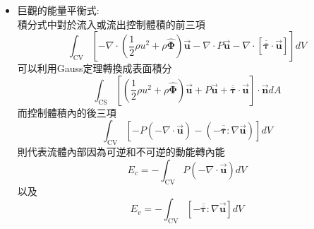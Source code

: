 \documentclass[../main.tex]{subfiles}
\begin{document}
\begin{itemize}
\begin{itemize}
      如果$\overline{\overline{\bm \tau}}$是牛頓流體，則可以代入其定義
      \begin{equation}
        -\overline{\overline{\bm \tau}}: \nabla \vec{\bm u} =\frac{2}{3}\mu \sum_{i=1}^{3}\sum_{j=1}^{3}\left[
          \left(
          \frac{\partial u_i}{\partial x_i} + \frac{\partial u_j}{\partial x_j}
        \right) - \frac{2}{3}\delta_{ij} \nabla \cdot \vec{\bm u}
        \right]^2 + \kappa \left(
          \nabla \cdot \vec{\bm u}
        \right)^2 = \mu \bm \Phi_u + \kappa \bm \Phi_b \label{eq:viscous_dissipation}
      \end{equation}
      $\bm \Phi_u$為剪切耗散函數(Shear Dissipation Function)\\
      $\bm \Phi_b$為體積耗散函數(Bulk Dissipation Function)\\
      兩者皆恆正，代表不可逆的能量耗散，並分別代表流體的抗剪和抗壓能力
    \item 巨觀的能量平衡式:\\
      積分式中對於流入或流出控制體積的前三項
      \begin{equation}
        \int_{\text{CV}} \left[
          -\nabla \cdot \left(
            \frac{1}{2}\rho u^2 + \rho \hat{\bm \Phi}
          \right) \vec{\bm u}
          - \nabla \cdot P \vec{\bm u}
          - \nabla \cdot [\overline{\overline{\bm \tau}} \cdot \vec{\bm u}]
        \right] dV
      \end{equation}
      可以利用Gauss定理轉換成表面積分
      \begin{equation}
        \int_{\text{CS}} \left[
          \left(
            \frac{1}{2}\rho u^2 + \rho \hat{\bm \Phi}
          \right) \vec{\bm u}
          + P \vec{\bm u}
          + \overline{\overline{\bm \tau}} \cdot \vec{\bm u}
        \right] \cdot \vec{\bm n} dA
      \end{equation}
      而控制體積內的後三項
      \begin{equation}
        \int_{\text{CV}} \left[
          - P\left(-\nabla \cdot \vec{\bm u}\right)
          - (-\overline{\overline{\bm \tau}} : \nabla \vec{\bm u})
        \right] dV
      \end{equation}
      則代表流體內部因為可逆和不可逆的動能轉內能
      \begin{equation}
        E_c = -\int_{\text{CV}} P\left(-\nabla \cdot \vec{\bm u}\right) dV
      \end{equation}
      以及
      \begin{equation}
        E_v = -\int_{\text{CV}} \left[-\overline{\overline{\bm \tau}} : \nabla \vec{\bm u} \right] dV

\end{equation}
\end{itemize}
\end{itemize}
\end{document}
